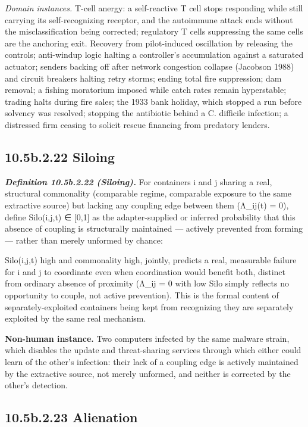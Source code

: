 \documentclass[
]{article}
\begin{document}
\emph{Domain instances.} T-cell anergy: a self-reactive T cell stops
responding while still carrying its self-recognizing receptor, and the
autoimmune attack ends without the misclassification being corrected;
regulatory T cells suppressing the same cells are the anchoring exit.
Recovery from pilot-induced oscillation by releasing the controls;
anti-windup logic halting a controller's accumulation against a
saturated actuator; senders backing off after network congestion
collapse (Jacobson 1988) and circuit breakers halting retry storms;
ending total fire suppression; dam removal; a fishing moratorium imposed
while catch rates remain hyperstable; trading halts during fire sales;
the 1933 bank holiday, which stopped a run before solvency was resolved;
stopping the antibiotic behind a C. difficile infection; a distressed
firm ceasing to solicit rescue financing from predatory lenders.

\hypertarget{b.2.22-siloing}{%
\subsection{10.5b.2.22 Siloing}\label{b.2.22-siloing}}

\emph{\textbf{Definition 10.5b.2.22 (Siloing).}} For containers i and j
sharing a real, structural commonality (comparable regime, comparable
exposure to the same extractive source) but lacking any coupling edge
between them (Λ\_ij(t) = 0), define Silo(i,j,t) ∈ {[}0,1{]} as the
adapter-supplied or inferred probability that this absence of coupling
is structurally maintained --- actively prevented from forming ---
rather than merely unformed by chance:

Silo(i,j,t) high and commonality high, jointly, predicts a real,
measurable failure for i and j to coordinate even when coordination
would benefit both, distinct from ordinary absence of proximity (Λ\_ij =
0 with low Silo simply reflects no opportunity to couple, not active
prevention). This is the formal content of separately-exploited
containers being kept from recognizing they are separately exploited by
the same real mechanism.

\textbf{Non-human instance.} Two computers infected by the same malware
strain, which disables the update and threat-sharing services through
which either could learn of the other's infection: their lack of a
coupling edge is actively maintained by the extractive source, not
merely unformed, and neither is corrected by the other's detection.

\hypertarget{b.2.23-alienation}{%
\subsection{10.5b.2.23 Alienation}\label{b.2.23-alienation}}
\end{document}
